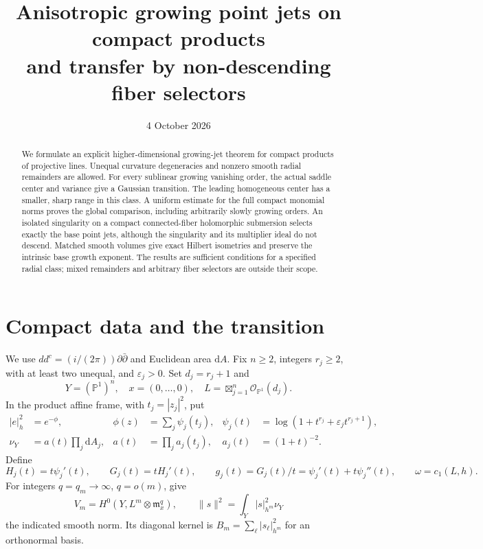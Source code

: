 \documentclass[11pt]{article}
\title{Anisotropic growing point jets on compact products\\
and transfer by non-descending fiber selectors}
\author{}
\date{4 October 2026}
\theoremstyle{remark}\newtheorem{remark}[theorem]{Remark}
\newcommand{\dA}{\mathrm dA}
\newcommand{\ddc}{dd^c}
\newcommand{\CP}{\mathbb P}
\newcommand{\OO}{\mathcal O}
\newcommand{\mm}{\mathfrak m}
\begin{document}
\maketitle
\begin{abstract}
We formulate an explicit higher-dimensional growing-jet theorem for compact
products of projective lines. Unequal curvature degeneracies and nonzero smooth
radial remainders are allowed. For every sublinear growing vanishing order,
the actual saddle center and variance give a Gaussian transition. The leading
homogeneous center has a smaller, sharp range in this class. A uniform estimate
for the full compact monomial norms proves the global comparison, including
arbitrarily slowly growing orders. An isolated singularity on a compact
connected-fiber holomorphic submersion selects exactly the base point jets,
although the singularity and its multiplier ideal do not descend. Matched
smooth volumes give exact Hilbert isometries and preserve the intrinsic base
growth exponent. The results are sufficient conditions for a specified radial
class; mixed remainders and arbitrary fiber selectors are outside their scope.
\end{abstract}

\section{Compact data and the transition}
We use $\ddc=(i/(2\pi))\partial\bar\partial$ and Euclidean area $\dA$.
Fix $n\geq2$, integers $r_j\geq2$, with at least two unequal, and
$\varepsilon_j>0$. Set $d_j=r_j+1$ and
\[
 Y=(\CP^1)^n,\quad x=(0,\ldots,0),\quad
 L=\boxtimes_{j=1}^n\OO_{\CP^1}(d_j).
\]
In the product affine frame, with $t_j=|z_j|^2$, put
\begin{align}
 |e|_h^2&=e^{-\phi},&
 \phi(z)&=\sum_j\psi_j(t_j),&
 \psi_j(t)&=\log(1+t^{r_j}+\varepsilon_jt^{r_j+1}),\label{eq:metric}\\
 \nu_Y&=a(t)\prod_j\dA_j,&
 a(t)&=\prod_j a_j(t_j),& a_j(t)&=(1+t)^{-2}.
\end{align}
Define
\[
 H_j(t)=t\psi_j'(t),\qquad G_j(t)=tH_j'(t),\qquad
 g_j(t)=G_j(t)/t=\psi_j'(t)+t\psi_j''(t),\qquad
 \omega=c_1(L,h).
\]
For integers $q=q_m\to\infty$, $q=o(m)$, give
\[
 V_m=H^0(Y,L^m\otimes\mm_x^q),\qquad
 \|s\|^2=\int_Y|s|_{h^m}^2\nu_Y
\]
the indicated smooth norm. Its diagonal kernel is
$B_m=\sum_\ell |s_\ell|_{h^m}^2$ for an orthonormal basis.
\end{document}
